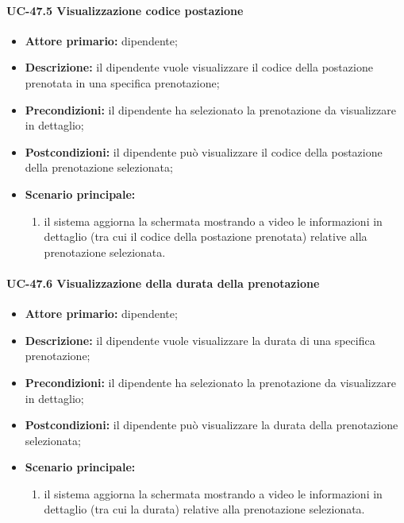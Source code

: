 \paragraph{UC-47.5 Visualizzazione codice postazione}

    \begin{itemize}
        \item \textbf{Attore primario:} dipendente;

        \item \textbf{Descrizione:} il dipendente vuole visualizzare il codice della postazione prenotata in una specifica prenotazione;

        \item \textbf{Precondizioni:} il dipendente ha selezionato la prenotazione da visualizzare in dettaglio;

        \item \textbf{Postcondizioni:} il dipendente può visualizzare il codice della postazione della prenotazione selezionata;

        \item \textbf{Scenario principale:}
            \begin{enumerate}
                \item il sistema aggiorna la schermata mostrando a video le informazioni in dettaglio (tra cui il codice della postazione prenotata) relative alla prenotazione selezionata.
            \end{enumerate}
    \end{itemize} 

\paragraph{UC-47.6 Visualizzazione della durata della prenotazione}

    \begin{itemize}
        \item \textbf{Attore primario:} dipendente;

        \item \textbf{Descrizione:} il dipendente vuole visualizzare la durata di una specifica prenotazione;

        \item \textbf{Precondizioni:} il dipendente ha selezionato la prenotazione da visualizzare in dettaglio;

        \item \textbf{Postcondizioni:} il dipendente può visualizzare la durata della prenotazione selezionata;

        \item \textbf{Scenario principale:}
            \begin{enumerate}
                \item il sistema aggiorna la schermata mostrando a video le informazioni in dettaglio (tra cui la durata) relative alla prenotazione selezionata.
            \end{enumerate}
    \end{itemize} 


